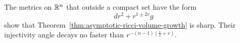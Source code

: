 \begin{remark}
\label{rem:sharpness-volume-growth-estimates}

The metrics on $\mathbb{R}^n$ that outside a compact set have the form
\begin{equation}
dr^2+r^{1\pm 2v}g
\tag{4.51}
\end{equation}
show that Theorem~\ref{thm:asymptotic-ricci-volume-growth} is sharp. Their injectivity angle decays no faster than
$r^{-(n-1)(\frac12+v)}$.
\end{remark}

